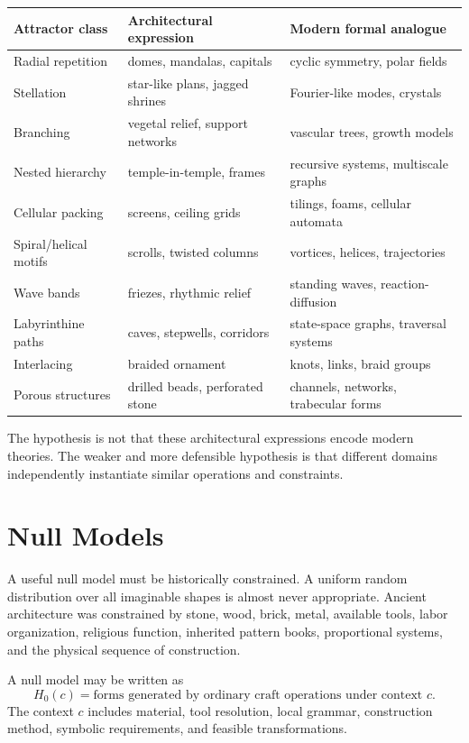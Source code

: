 \begin{center}
\begin{tabular}{p{3.2cm}p{4.4cm}p{5.2cm}}
\toprule
Attractor class & Architectural expression & Modern formal analogue \\
\midrule
Radial repetition & domes, mandalas, capitals & cyclic symmetry, polar fields \\
Stellation & star-like plans, jagged shrines & Fourier-like modes, crystals \\
Branching & vegetal relief, support networks & vascular trees, growth models \\
Nested hierarchy & temple-in-temple, frames & recursive systems, multiscale graphs \\
Cellular packing & screens, ceiling grids & tilings, foams, cellular automata \\
Spiral/helical motifs & scrolls, twisted columns & vortices, helices, trajectories \\
Wave bands & friezes, rhythmic relief & standing waves, reaction-diffusion \\
Labyrinthine paths & caves, stepwells, corridors & state-space graphs, traversal systems \\
Interlacing & braided ornament & knots, links, braid groups \\
Porous structures & drilled beads, perforated stone & channels, networks, trabecular forms \\
\bottomrule
\end{tabular}
\end{center}

The hypothesis is not that these architectural expressions encode modern theories. The weaker and more defensible hypothesis is that different domains independently instantiate similar operations and constraints.

\section{Null Models}

A useful null model must be historically constrained. A uniform random distribution over all imaginable shapes is almost never appropriate. Ancient architecture was constrained by stone, wood, brick, metal, available tools, labor organization, religious function, inherited pattern books, proportional systems, and the physical sequence of construction.

A null model may be written as
\begin{equation}
    H_0(c)=\text{forms generated by ordinary craft operations under context }c.
\end{equation}
The context $c$ includes material, tool resolution, local grammar, construction method, symbolic requirements, and feasible transformations.

